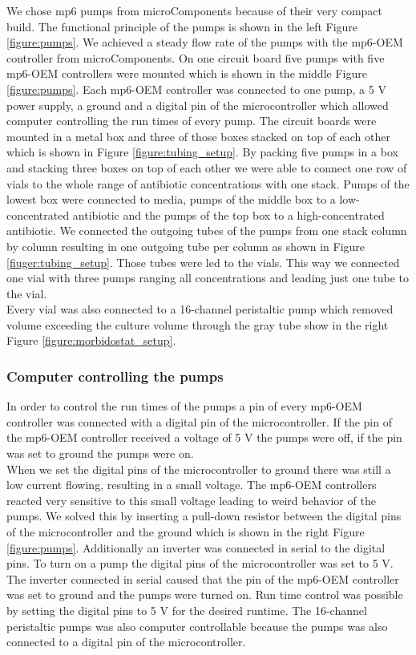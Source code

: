 We chose mp6 pumps from microComponents because of their very compact build. The functional principle of the pumps is shown in the left Figure \ref{figure:pumps}. We achieved a steady flow rate of the pumps with the mp6-OEM controller from microComponents. On one circuit board five pumps with five mp6-OEM controllers were mounted which is shown in the middle Figure \ref{figure:pumps}. Each mp6-OEM controller was connected to one pump, a 5 V power supply, a ground and a digital pin of  the microcontroller which allowed computer controlling the run times of every pump. The circuit boards were mounted in a metal box and three of those boxes stacked on top of each other which is shown in Figure \ref{figure:tubing_setup}. By packing five pumps in a box and stacking three boxes on top of each other we were able to connect one row of vials to the whole range of antibiotic concentrations with one stack. Pumps of the lowest box were connected to media, pumps of the middle box to a low-concentrated antibiotic and the pumps of the top box to a high-concentrated antibiotic. We connected the outgoing tubes of the pumps from one stack column by column resulting in one outgoing tube per column as shown in Figure \ref{fiuger:tubing_setup}. Those tubes were led to the vials. This way we connected one vial with three pumps ranging all concentrations and leading just one tube to the vial.\\
Every vial was also connected to a 16-channel peristaltic pump which removed volume exceeding the culture volume through the gray tube show in the right Figure \ref{figure:morbidostat_setup}. 

\subsubsection{Computer controlling the pumps}
In order to control the run times of the pumps a pin of every mp6-OEM controller was connected with a digital pin of the microcontroller. If the pin of the mp6-OEM controller received a voltage of 5 V the pumps were off, if the pin was set to ground the pumps were on. \\
When we set the digital pins of the microcontroller to ground there was still a low current flowing, resulting in a small voltage. The mp6-OEM controllers reacted very sensitive to this small voltage leading to weird behavior of the pumps. We solved this by inserting a pull-down resistor between the digital pins of the microcontroller and the ground which is shown in the right Figure \ref{figure:pumps}. Additionally an inverter was connected in serial to the digital pins. To turn on a pump the digital pins of the microcontroller was set to 5 V. The inverter connected in serial caused that the pin of the mp6-OEM controller was set to ground and the pumps were turned on. Run time control was possible by setting the digital pins to 5 V for the desired runtime.
The 16-channel peristaltic pumps was also computer controllable because the pumps was also connected to a digital pin of the microcontroller.
\label{section:pumps}

